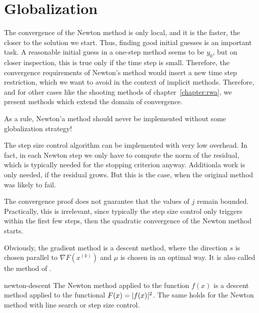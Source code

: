 \section{Globalization}

\begin{intro}
  The convergence of the Newton method is only local, and it is the
  faster, the closer to the solution we start. Thus, finding good
  initial guesses is an important task. A reasonable initial guess in
  a one-step method seems to be $y_0$, but on closer inspection, this
  is true only if the time step is small. Therefore, the convergence
  requirements of Newton's method would insert a new time step
  restriction, which we want to avoid in the context of implicit
  methods. Therefore, and for other cases like the shooting
  methods of chapter~\ref{chapter:rwa}, we present
  methods which extend the domain of convergence.

  As a rule, Newton'a method should never be implemented without some
  globalization strategy!
\end{intro}




\begin{remark}
  The step size control algorithm can be implemented with very low
  overhead. In fact, in each Newton step we only have to compute the
  norm of the residual, which is typically needed for the stopping
  criterion anyway. Additionla work is only needed, if the residual
  grows. But this is the case, when the original method was likely to
  fail.

  The convergence proof does not guarantee that the values of $j$
  remain bounded. Practically, this is irrelevant, since typically the
  step size control only triggers within the first few steps, then the
  quadratic convergence of the Newton method starts.
\end{remark}



\begin{remark}
  Obviously, the gradient method is a descent method, where the direction $s$
  is chosen parallel to $\nabla F(x^{(k)})$ and $\mu$ is chosen in an
  optimal way. It is also called the method of .
\end{remark}

\begin{Lemma}{newton-descent}
  The Newton method applied to the function $f(x)$ is a descent method
  applied to the functional $F(x) = \lvert f(x)\rvert^2$. The same holds for
  the Newton method with line search or step size control.
\end{Lemma}

